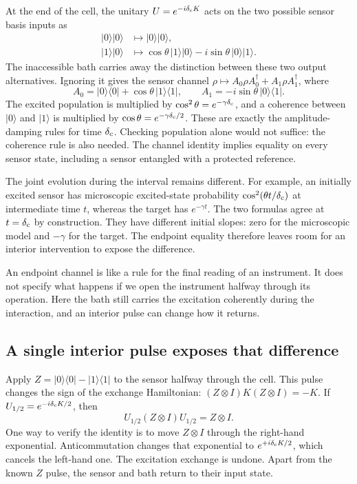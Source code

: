 \documentclass[11pt,a4paper]{article}
\numberwithin{equation}{section}
\theoremstyle{remark}
\begin{document}
At the end of the cell, the unitary $U=e^{-i\delta_{\rm c}K}$ acts on the two possible
sensor basis inputs as
\begin{align}
 |0\rangle|0\rangle&\longmapsto |0\rangle|0\rangle,\nonumber\\
 |1\rangle|0\rangle&\longmapsto
 \cos\theta\,|1\rangle|0\rangle
 -i\sin\theta\,|0\rangle|1\rangle.
 \label{sim:exchange-column}
\end{align}
The inaccessible bath carries away the distinction between these two
output alternatives. Ignoring it gives the sensor channel
$\rho\mapsto A_0\rho A_0^\dagger+A_1\rho A_1^\dagger$, where
\begin{equation}
 A_0=|0\rangle\langle0|+\cos\theta\,|1\rangle\langle1|,
 \qquad A_1=-i\sin\theta\,|0\rangle\langle1|.
 \label{sim:exchange-kraus}
\end{equation}
The excited population is multiplied by $\cos^2\theta=e^{-\gamma \delta_{\rm c}}$,
and a coherence between $|0\rangle$ and $|1\rangle$ is multiplied by
$\cos\theta=e^{-\gamma \delta_{\rm c}/2}$. These are exactly the amplitude-damping
rules for time $\delta_{\rm c}$. Checking population alone would not suffice: the
coherence rule is also needed. The channel identity implies equality on
every sensor state, including a sensor entangled with a protected reference.

The joint evolution during the interval remains different. For example,
an initially excited sensor has microscopic excited-state probability
$\cos^2(\theta t/\delta_{\rm c})$ at intermediate time $t$, whereas the target has
$e^{-\gamma t}$. The two formulas agree at $t=\delta_{\rm c}$ by construction. They
have different initial slopes: zero for the microscopic model and
$-\gamma$ for the target. The endpoint equality therefore leaves room
for an interior intervention to expose the difference.

An endpoint channel is like a rule for the final reading of an instrument.
It does not specify what happens if we open the instrument halfway through
its operation. Here the bath still carries the excitation coherently during
the interaction, and an interior pulse can change how it returns.

\subsection{A single interior pulse exposes that difference}
\label{sim:echo}

Apply $Z=|0\rangle\langle0|-|1\rangle\langle1|$ to the sensor halfway
through the cell. This pulse changes the sign of the exchange Hamiltonian:
$(Z\otimes I)K(Z\otimes I)=-K$. If $U_{1/2}=e^{-i\delta_{\rm c}K/2}$, then
\begin{equation}
 U_{1/2}(Z\otimes I)U_{1/2}=Z\otimes I.
 \label{sim:exact-echo}
\end{equation}
One way to verify the identity is to move $Z\otimes I$ through the
right-hand exponential. Anticommutation changes that exponential to
$e^{+i\delta_{\rm c}K/2}$, which cancels the left-hand one. The excitation exchange
is undone. Apart from the known $Z$ pulse, the sensor and bath return
to their input state.
\end{document}
